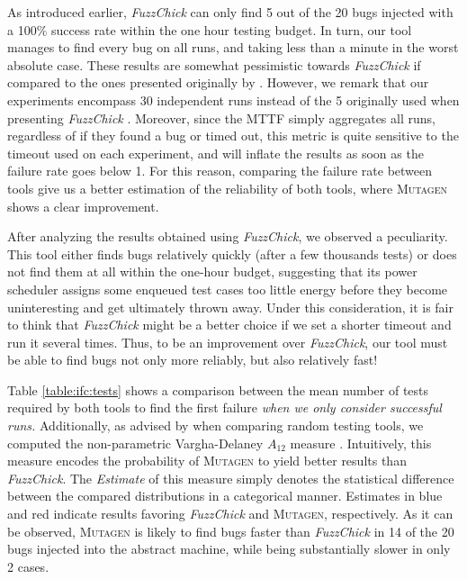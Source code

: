 \documentclass[sigconf, anonymous, review]{acmart}
\newcommand{\fuzzchick}{\textit{FuzzChick}\xspace}
\newcommand{\mutagen}{\textsc{Mutagen}\xspace}
\begin{document}
As introduced earlier, \fuzzchick can only find 5 out of the 20 bugs injected
with a 100\% success rate within the one hour testing budget.
%
In turn, our tool manages to find every bug on all runs, and taking less than a
minute in the worst absolute case.
%
These results are somewhat pessimistic towards \fuzzchick if compared to the
ones presented originally by \citeauthor{lampropoulos2019coverage}.
%
However, we remark that our experiments encompass 30 independent runs instead of
the 5 originally used when presenting \fuzzchick
\citeyearpar{lampropoulos2019coverage}.
%
Moreover, since the MTTF simply aggregates all runs, regardless of if they found
a bug or timed out, this metric is quite sensitive to the timeout used on each
experiment, and will inflate the results as soon as the failure rate goes below
1.
%
For this reason, comparing the failure rate between tools give us a better
estimation of the reliability of both tools, where \mutagen shows a clear
improvement.

After analyzing the results obtained using \fuzzchick, we observed a
peculiarity.
%
This tool either finds bugs relatively quickly (after a few thousands tests) or
does not find them at all within the one-hour budget, suggesting that its power
scheduler assigns some enqueued test cases too little energy before they become
uninteresting and get ultimately thrown away.
%
Under this consideration, it is fair to think that \fuzzchick might be a better
choice if we set a shorter timeout and run it several times.
%
Thus, to be an improvement over \fuzzchick, our tool must be able to find bugs
not only more reliably, but also relatively fast!


Table \ref{table:ifc:tests} shows a comparison between the mean number of tests
required by both tools to find the first failure \emph{when we only consider
  successful runs.}
%
Additionally, as advised by \citeauthor{arcuri2014hitchhiker}
\cite{arcuri2014hitchhiker} when comparing random testing tools, we computed the
non-parametric Vargha-Delaney $A_{12}$ measure \cite{vargha2000critique}.
%
Intuitively, this measure encodes the probability of \mutagen to yield better
results than \fuzzchick.
%
The \textit{Estimate} of this measure simply denotes the statistical difference
between the compared distributions in a categorical manner.
%
Estimates in {\color{blue} blue} and {\color{red} red} indicate results
favoring \fuzzchick and \mutagen, respectively.
%
As it can be observed,
%
%
\mutagen is likely to find bugs faster than \fuzzchick in 14 of the 20 bugs
injected into the abstract machine, while being substantially slower in only 2
cases.
\end{document}
